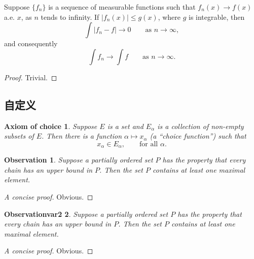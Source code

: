 \begin{theorem}
	Suppose $\{f_n\}$ is a sequence of measurable functions such that
	$f_n(x) \to f(x)$ a.e. $x$, as $n$ tends to infinity.
	If $|f_n(x)| \leq g(x)$, where $g$ is integrable, then
	\begin{equation}
	\int |f_n - f| \to 0 \qquad \text{as } n \to \infty,
	\end{equation}
	and consequently
	\begin{equation}
	\int f_n \to \int f \qquad \text{as } n \to \infty.
	\end{equation}
\end{theorem}

\begin{proof}
	Trivial.
\end{proof}


\subsection{自定义}

\newtheorem*{axiomofchoice}{Axiom of choice}
\begin{axiomofchoice}
	Suppose $E$ is a set and ${E_\alpha}$ is a collection of
	non-empty subsets of $E$. Then there is a function $\alpha
	\mapsto x_\alpha$ (a ``choice function'') such that
	\begin{equation}
	x_\alpha \in E_\alpha,\qquad \text{for all }\alpha.
	\end{equation}
\end{axiomofchoice}

\newtheorem{observation}{Observation}[chapter]
\begin{observation}
	Suppose a partially ordered set $P$ has the property
	that every chain has an upper bound in $P$. Then the
	set $P$ contains at least one maximal element.
\end{observation}
\begin{proof}[A concise proof]
	Obvious.
\end{proof}

\newtheorem{observationvar2}[observation]{Observationvar2}
\begin{observationvar2}
	Suppose a partially ordered set $P$ has the property
	that every chain has an upper bound in $P$. Then the
	set $P$ contains at least one maximal element.
\end{observationvar2}
\begin{proof}[A concise proof]
	Obvious.
\end{proof}
